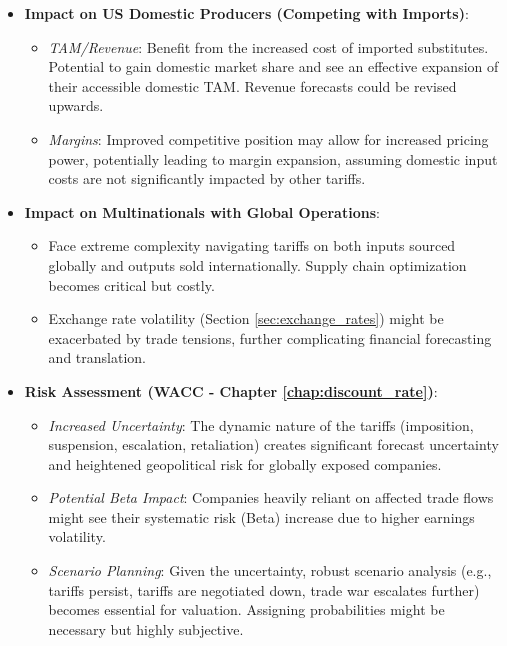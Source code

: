\begin{itemize}
    \item \textbf{Impact on US Domestic Producers (Competing with Imports)}:
          \begin{itemize}
              \item \textit{TAM/Revenue}: Benefit from the increased cost of imported substitutes. Potential to gain domestic market share and see an effective expansion of their accessible domestic TAM. Revenue forecasts could be revised upwards.
              \item \textit{Margins}: Improved competitive position may allow for increased pricing power, potentially leading to margin expansion, assuming domestic input costs are not significantly impacted by other tariffs.
          \end{itemize}

    \item \textbf{Impact on Multinationals with Global Operations}:
          \begin{itemize}
              \item Face extreme complexity navigating tariffs on both inputs sourced globally and outputs sold internationally. Supply chain optimization becomes critical but costly.
              \item Exchange rate volatility (Section \ref{sec:exchange_rates}) might be exacerbated by trade tensions, further complicating financial forecasting and translation.
          \end{itemize}

    \item \textbf{Risk Assessment (WACC - Chapter \ref{chap:discount_rate})}:
          \begin{itemize}
              \item \textit{Increased Uncertainty}: The dynamic nature of the tariffs (imposition, suspension, escalation, retaliation) creates significant forecast uncertainty and heightened geopolitical risk for globally exposed companies.
              \item \textit{Potential Beta Impact}: Companies heavily reliant on affected trade flows might see their systematic risk (Beta) increase due to higher earnings volatility.
              \item \textit{Scenario Planning}: Given the uncertainty, robust scenario analysis (e.g., tariffs persist, tariffs are negotiated down, trade war escalates further) becomes essential for valuation. Assigning probabilities might be necessary but highly subjective.
          \end{itemize}
\end{itemize}

